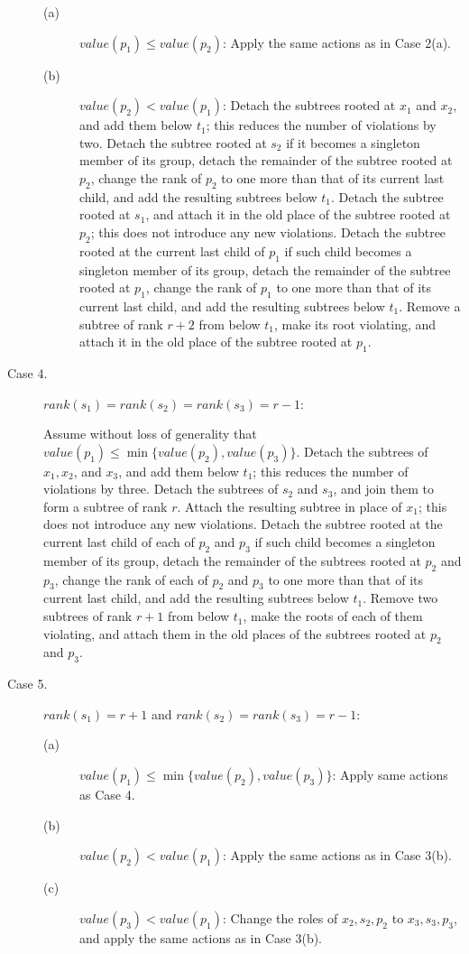 \documentclass{llncs}
\newcommand{\rank}{\mbox{$\mathit{rank}$}}
\begin{document}
\begin{description}
\begin{description}
\item[(a)] $value(p_1) \leq value(p_2)$: Apply the same actions as in Case 2(a).
\item[(b)] $value(p_2) < value(p_1)$: Detach the subtrees rooted at $x_1$ and $x_2$, and add
  them below $t_1$; this reduces the number of violations by two. 
  Detach the subtree rooted at $s_2$ if it becomes a singleton member of its group, 
  detach the remainder of the subtree rooted at $p_2$, 
  change the rank of $p_2$ to one more than that of its current last child, 
  and add the resulting subtrees below $t_1$.
  Detach the subtree rooted at $s_1$, and attach it in the old place of the subtree
  rooted at $p_2$; this does not introduce any new violations. 
  Detach the subtree rooted at the current last child of $p_1$ if such child becomes a singleton member of its group, 
  detach the remainder of the subtree rooted at $p_1$, 
  change the rank of $p_1$ to one more than that of its current last child, 
  and add the resulting subtrees below $t_1$.
  Remove a subtree of rank $r+2$ from below $t_1$, make its root violating,
  and attach it in the old place of the subtree rooted at $p_1$.
\end{description}


\item[Case 4.] $\rank{}(s_1) = \rank{}(s_2) = \rank{}(s_3) = r-1$:

Assume without loss of generality that $value(p_1) \leq
\min\{value(p_2),value(p_3)\}$.  Detach the subtrees of $x_1, x_2$, and $x_3$, and add them
below $t_1$; this reduces the number of violations by three.
Detach the subtrees of $s_2$ and $s_3$, and join them to form a
subtree of rank $r$. Attach the resulting subtree in place of
$x_1$; this does not introduce any new violations. 
Detach the subtree rooted at the current last child of each of $p_2$ and $p_3$
if such child becomes a singleton member of its group,
detach the remainder of the subtrees rooted at $p_2$ and $p_3$, change the rank of each
of $p_2$ and $p_3$ to one more than that of its current last child,
and add the resulting subtrees below $t_1$. Remove two subtrees of rank $r+1$
from below $t_1$, make the roots of each of them violating, and attach them in the old
places of the subtrees rooted at $p_2$ and $p_3$.

\item[Case 5.] $\rank{}(s_1) = r+1$ and $\rank{}(s_2) = \rank{}(s_3) = r-1$:
\begin{description}
\item[(a)] $value(p_1) \leq \min\{value(p_2),value(p_3)\}$: Apply same actions as Case 4.
\item[(b)] $value(p_2) < value(p_1)$: Apply the same actions as in Case 3(b).
\item[(c)] $value(p_3) < value(p_1)$: Change the roles of
  $x_2,s_2,p_2$ to $x_3,s_3,p_3$, and apply the same actions as in Case 3(b).
\end{description}
\end{description}
\end{document}
